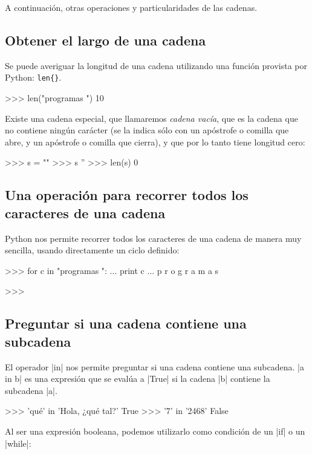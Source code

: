 A continuación, otras operaciones y particularidades de las cadenas.

\subsection{Obtener el largo de una cadena}

Se puede averiguar la longitud de una cadena utilizando
una función provista por Python: \lstinline+len{}+.
\begin{codigo-python-sn}
>>> len("programas ")
10
\end{codigo-python-sn}

Existe una cadena especial, que llamaremos {\it cadena vacía}, que
es la cadena que no contiene ningún carácter (se la indica sólo con
un apóstrofe o comilla que abre, y un apóstrofe o comilla que cierra),
y que por lo tanto tiene longitud cero:

\begin{codigo-python-sn}
>>> s = ""
>>> s
''
>>> len(s)
0
\end{codigo-python-sn}

\subsection[Recorrer una cadena]{Una operación para recorrer todos los caracteres de una cadena}

Python nos permite recorrer todos los caracteres de una cadena de
manera muy sencilla, usando directamente un ciclo definido:

\begin{codigo-python-sn}
>>> for c in "programas ":
...     print c
...
p
r
o
g
r
a
m
a
s

>>>
\end{codigo-python-sn}

\subsection{Preguntar si una cadena contiene una subcadena}

El operador |in| nos permite preguntar si una cadena contiene una
subcadena. |a in b| es una expresión que se evalúa a |True| si la cadena |b|
contiene la subcadena |a|.

\begin{codigo-python-sn}
>>> 'qué' in 'Hola, ¿qué tal?'
True
>>> '7' in '2468'
False
\end{codigo-python-sn}

Al ser una expresión booleana, podemos utilizarlo como condición de un |if| o
un |while|:

